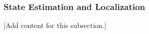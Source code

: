 
\subsubsection{State Estimation and Localization}
\label{subsubsec:design_2_5_2_state_estimation_localization}

[Add content for this subsection.]
